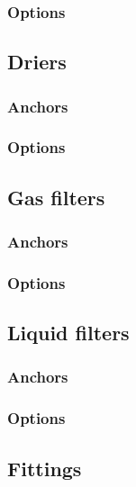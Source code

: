 \documentclass[a4paper, twoside]{article}
\begin{document}
        \subsubsection{Options}
            

    \subsection{Driers}
        \subsubsection{Anchors}
            

        \subsubsection{Options}
            

    \subsection{Gas filters}
        \subsubsection{Anchors}
            

        \subsubsection{Options}
            
    
    \subsection{Liquid filters}
        \subsubsection{Anchors}
            

        \subsubsection{Options}
            
        
    \subsection{Fittings}
        

    
\end{document}
